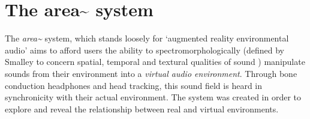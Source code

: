 %
%
%


\section{The area\textasciitilde{} system}      \label{sec: area-system}
The \textit{area\textasciitilde{}}  system, which stands loosely for ‘augmented reality environmental audio’ aims to afford users the ability to spectromorphologically (defined by Smalley to concern spatial, temporal and textural qualities of sound \citeyearpar{smalley1997}) manipulate sounds from their environment into a \textit{virtual audio environment}. Through bone conduction headphones and head tracking, this sound field is heard in synchronicity with their actual environment. The system was created in order to explore and reveal the relationship between real and virtual environments.

